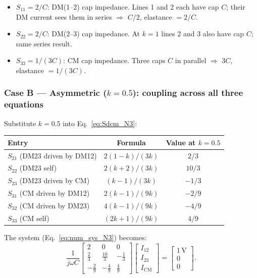 \begin{statebox}[Diagonal Entries at $k = 1$: Circuit Check]
\begin{itemize}
    \item $S_{11} = 2/C$: DM(1--2) cap impedance.
          Lines 1 and 2 each have cap $C$; their DM current sees
          them in series $\Rightarrow$ $C/2$, elastance $= 2/C$. \checkmark
    \item $S_{22} = 2/C$: DM(2--3) cap impedance.
          At $k = 1$ lines 2 and 3 also have cap $C$; same
          series result. \checkmark
    \item $S_{33} = 1/(3C)$: CM cap impedance.
          Three caps $C$ in parallel $\Rightarrow$ $3C$,
          elastance $= 1/(3C)$. \checkmark
\end{itemize}
\end{statebox}

\subsubsection*{Case B — Asymmetric ($k = 0.5$): coupling across all
three equations}

Substitute $k = 0.5$ into Eq.~\eqref{eq:Sdcm_N3}:

\begin{center}
\renewcommand{\arraystretch}{1.5}
\begin{tabular}{lcc}
\toprule
Entry & Formula & Value at $k = 0.5$ \\
\midrule
$S_{21}$ (DM23 driven by DM12) & $2(1-k)/(3k)$  & $2/3$  \\
$S_{22}$ (DM23 self)           & $2(k+2)/(3k)$  & $10/3$ \\
$S_{23}$ (DM23 driven by CM)   & $(k-1)/(3k)$   & $-1/3$ \\
$S_{31}$ (CM driven by DM12)   & $2(k-1)/(9k)$  & $-2/9$ \\
$S_{32}$ (CM driven by DM23)   & $4(k-1)/(9k)$  & $-4/9$ \\
$S_{33}$ (CM self)             & $(2k+1)/(9k)$  & $4/9$  \\
\bottomrule
\end{tabular}
\end{center}

The system (Eq.~\ref{eq:num_sys_N3}) becomes:
\[
\frac{1}{j\omega C}
\begin{bmatrix}
    2 & 0 & 0 \\
    \tfrac{2}{3} & \tfrac{10}{3} & -\tfrac{1}{3} \\
    -\tfrac{2}{9} & -\tfrac{4}{9} & \tfrac{4}{9}
\end{bmatrix}
\begin{bmatrix} I_{12} \\ I_{23} \\ I_{\mathrm{CM}} \end{bmatrix}
=
\begin{bmatrix} 1\,\mathrm{V} \\ 0 \\ 0 \end{bmatrix}.
\]

